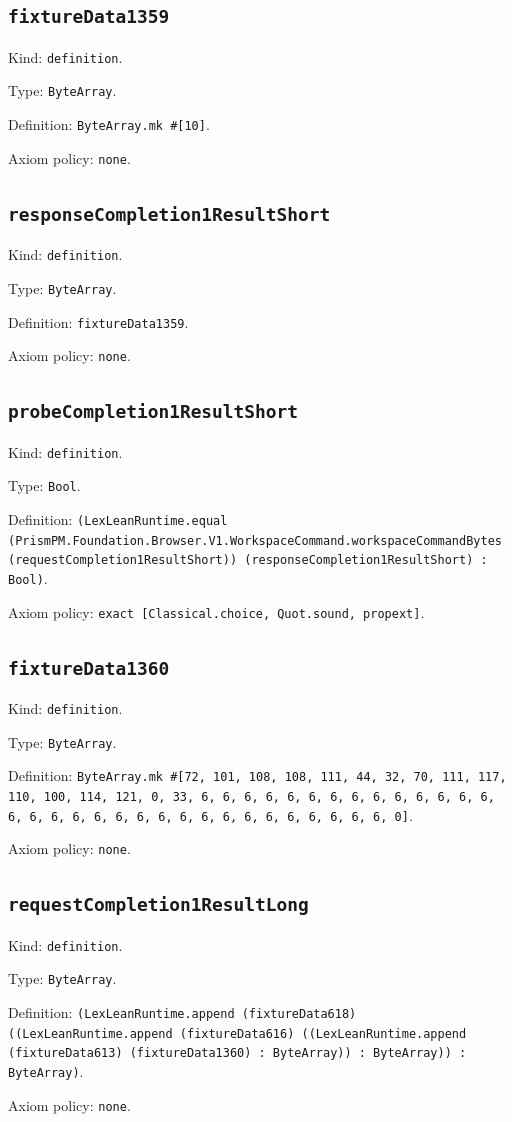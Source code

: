 \documentclass[11pt]{article}
\begin{document}
\subsection*{\texttt{fixtureData1359}}
\noindent Kind: \texttt{definition}.\par
\noindent Type: \texttt{ByteArray}.\par
\noindent Definition: \texttt{ByteArray.mk \#[10]}.\par
\noindent Axiom policy: \texttt{none}.\par
\subsection*{\texttt{responseCompletion1ResultShort}}
\noindent Kind: \texttt{definition}.\par
\noindent Type: \texttt{ByteArray}.\par
\noindent Definition: \texttt{fixtureData1359}.\par
\noindent Axiom policy: \texttt{none}.\par
\subsection*{\texttt{probeCompletion1ResultShort}}
\noindent Kind: \texttt{definition}.\par
\noindent Type: \texttt{Bool}.\par
\noindent Definition: \texttt{(LexLeanRuntime.equal (PrismPM.Foundation.Browser.V1.WorkspaceCommand.workspaceCommandBytes (requestCompletion1ResultShort)) (responseCompletion1ResultShort) : Bool)}.\par
\noindent Axiom policy: \texttt{exact [Classical.choice, Quot.sound, propext]}.\par
\subsection*{\texttt{fixtureData1360}}
\noindent Kind: \texttt{definition}.\par
\noindent Type: \texttt{ByteArray}.\par
\noindent Definition: \texttt{ByteArray.mk \#[72, 101, 108, 108, 111, 44, 32, 70, 111, 117, 110, 100, 114, 121, 0, 33, 6, 6, 6, 6, 6, 6, 6, 6, 6, 6, 6, 6, 6, 6, 6, 6, 6, 6, 6, 6, 6, 6, 6, 6, 6, 6, 6, 6, 6, 6, 6, 6, 0]}.\par
\noindent Axiom policy: \texttt{none}.\par
\subsection*{\texttt{requestCompletion1ResultLong}}
\noindent Kind: \texttt{definition}.\par
\noindent Type: \texttt{ByteArray}.\par
\noindent Definition: \texttt{(LexLeanRuntime.append (fixtureData618) ((LexLeanRuntime.append (fixtureData616) ((LexLeanRuntime.append (fixtureData613) (fixtureData1360) : ByteArray)) : ByteArray)) : ByteArray)}.\par
\noindent Axiom policy: \texttt{none}.\par
\end{document}
